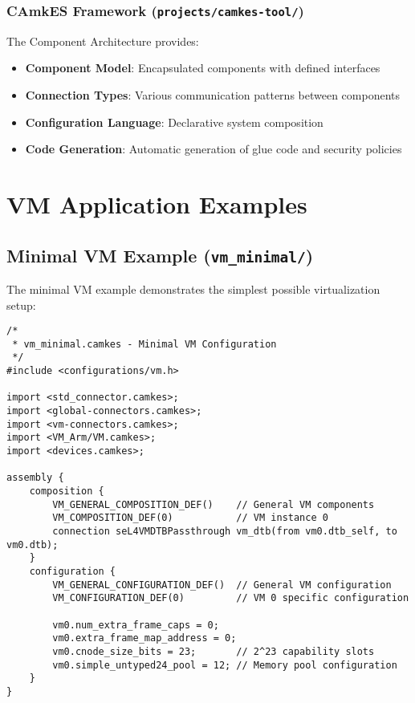\documentclass[12pt,a4paper]{article}
\begin{document}
\subsubsection{CAmkES Framework (\texttt{projects/camkes-tool/})}
The Component Architecture provides:
\begin{itemize}
    \item \textbf{Component Model}: Encapsulated components with defined interfaces
    \item \textbf{Connection Types}: Various communication patterns between components
    \item \textbf{Configuration Language}: Declarative system composition
    \item \textbf{Code Generation}: Automatic generation of glue code and security policies
\end{itemize}

\section{VM Application Examples}

\subsection{Minimal VM Example (\texttt{vm\_minimal/})}

The minimal VM example demonstrates the simplest possible virtualization setup:


\begin{lstlisting}[style=camkes]
/*
 * vm_minimal.camkes - Minimal VM Configuration
 */
#include <configurations/vm.h>

import <std_connector.camkes>;
import <global-connectors.camkes>;
import <vm-connectors.camkes>;
import <VM_Arm/VM.camkes>;
import <devices.camkes>;

assembly {
    composition {
        VM_GENERAL_COMPOSITION_DEF()    // General VM components
        VM_COMPOSITION_DEF(0)           // VM instance 0
        connection seL4VMDTBPassthrough vm_dtb(from vm0.dtb_self, to vm0.dtb);
    }
    configuration {
        VM_GENERAL_CONFIGURATION_DEF()  // General VM configuration
        VM_CONFIGURATION_DEF(0)         // VM 0 specific configuration

        vm0.num_extra_frame_caps = 0;
        vm0.extra_frame_map_address = 0;
        vm0.cnode_size_bits = 23;       // 2^23 capability slots
        vm0.simple_untyped24_pool = 12; // Memory pool configuration
    }
}
\end{lstlisting}
\end{document}
